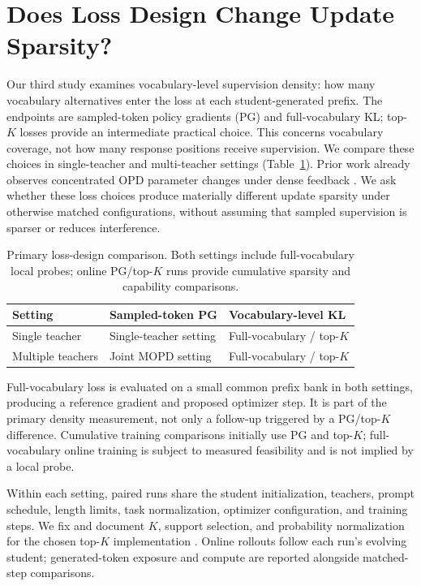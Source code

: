 \section{Does Loss Design Change Update Sparsity?}
\label{sec:density}

Our third study examines vocabulary-level supervision density: how many
vocabulary alternatives enter the loss at each student-generated prefix.
The endpoints are sampled-token policy gradients (PG) and full-vocabulary
KL; top-$K$ losses provide an intermediate practical choice. This concerns
vocabulary coverage, not how many response positions receive supervision.
We compare these choices in single-teacher and multi-teacher settings
(Table~\ref{tab:density_controls}). Prior work already observes concentrated
OPD parameter changes under dense feedback \citep{yu2026denseupdates}.
We ask whether these loss choices produce materially different
update sparsity under otherwise matched configurations, without assuming
that sampled supervision is sparser or reduces interference.

\begin{table}[t]
\centering
\small
\begin{tabular}{lll}
\toprule
Setting & Sampled-token PG & Vocabulary-level KL \\
\midrule
Single teacher & Single-teacher setting & Full-vocabulary / top-$K$ \\
Multiple teachers & Joint MOPD setting & Full-vocabulary / top-$K$ \\
\bottomrule
\end{tabular}
\caption{Primary loss-design comparison. Both settings include full-vocabulary
local probes; online PG/top-$K$ runs provide cumulative sparsity and
capability comparisons.}
\label{tab:density_controls}
\end{table}

Full-vocabulary loss is evaluated on a small common prefix bank in both
settings, producing a reference gradient and proposed optimizer step.
It is part of the primary density measurement, not only a follow-up
triggered by a PG/top-$K$ difference. Cumulative training comparisons
initially use PG and top-$K$; full-vocabulary online training is subject
to measured feasibility and is not implied by a local probe.

Within each setting, paired runs share the student initialization, teachers,
prompt schedule, length limits, task normalization, optimizer configuration,
and training steps. We fix and document $K$, support selection, and probability
normalization for the chosen top-$K$ implementation
\citep{ma2026mopdmultiteacheronpolicydistillation}. Online rollouts follow each
run's evolving student; generated-token exposure and compute are reported
alongside matched-step comparisons.

